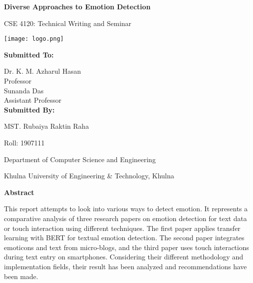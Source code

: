 \documentclass[12pt]{article} %
\begin{document}
\begin{titlepage}
    \centering
    \vspace*{1cm}
    
    \Huge
    \textbf{Diverse Approaches to Emotion Detection}                                                          
  
    \vspace{1.5cm}
    
    \LARGE
    CSE 4120: Technical Writing and Seminar
    
    \vspace{2cm}
    
    \texttt{[image: logo.png]} %
    
    \vspace{1cm}
    \textbf{Submitted To:}
    
   \vspace{0.2cm}
    
    Dr. K. M. Azharul Hasan\\
    Professor\\
    \vspace{0.2cm}
    Sunanda Das\\
    Assistant Professor\\

    \vspace{0.8cm}
    \Large
    \textbf{Submitted By: }
    
    MST. Rubaiya Raktin Raha
    
    \vspace{0.3cm}
    
    Roll: 1907111
    \vspace{1.5cm}
    
    Department of Computer Science and Engineering
    
    Khulna University of Engineering \& Technology, Khulna
    
    \vspace{2cm}                                 
  
\end{titlepage}

\newpage
\begin{center}
  \vspace{2cm}                                        
  
    \centering                                                 
    \textbf{\fontsize{14}{14}\selectfont Abstract}
\end{center}
This report attempts to look into various ways to detect emotion. It represents a comparative analysis of three research papers on emotion detection for text data or touch interaction using different techniques. The first paper applies transfer learning with BERT for textual emotion detection. The second paper integrates emoticons and text from micro-blogs, and the third paper uses touch interactions during text entry on smartphones. Considering their different methodology and implementation fields, their result has been analyzed and recommendations have been made.  
\end{document}

